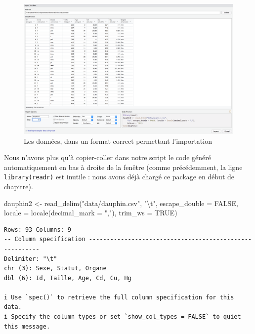 \documentclass[
  letterpaper,
  DIV=11,
  numbers=noendperiod]{scrreprt}
\newenvironment{Shaded}{\begin{snugshade}}{\end{snugshade}}
\newcommand{\AttributeTok}[1]{\textcolor[rgb]{0.40,0.45,0.13}{#1}}
\newcommand{\ConstantTok}[1]{\textcolor[rgb]{0.56,0.35,0.01}{#1}}
\newcommand{\FunctionTok}[1]{\textcolor[rgb]{0.28,0.35,0.67}{#1}}
\newcommand{\NormalTok}[1]{\textcolor[rgb]{0.00,0.23,0.31}{#1}}
\newcommand{\OtherTok}[1]{\textcolor[rgb]{0.00,0.23,0.31}{#1}}
\newcommand{\SpecialCharTok}[1]{\textcolor[rgb]{0.37,0.37,0.37}{#1}}
\newcommand{\StringTok}[1]{\textcolor[rgb]{0.13,0.47,0.30}{#1}}
\begin{document}
\begin{figure}

{\centering \includegraphics[width=1\textwidth,height=\textheight]{./images/importcsv4.png}

}

\caption{Les données, dans un format correct permettant l'importation}

\end{figure}

Nous n'avons plus qu'à copier-coller dans notre script le code généré
automatiquement en bas à droite de la fenêtre (comme précédemment, la
ligne \texttt{library(readr)} est inutile : nous avons déjà chargé ce
package en début de chapitre).

\begin{Shaded}
\begin{Highlighting}[]
\NormalTok{dauphin2 }\OtherTok{\textless{}{-}} \FunctionTok{read\_delim}\NormalTok{(}\StringTok{"data/dauphin.csv"}\NormalTok{, }
    \StringTok{"}\SpecialCharTok{\textbackslash{}t}\StringTok{"}\NormalTok{, }\AttributeTok{escape\_double =} \ConstantTok{FALSE}\NormalTok{, }\AttributeTok{locale =} \FunctionTok{locale}\NormalTok{(}\AttributeTok{decimal\_mark =} \StringTok{","}\NormalTok{), }
    \AttributeTok{trim\_ws =} \ConstantTok{TRUE}\NormalTok{)}
\end{Highlighting}
\end{Shaded}

\begin{verbatim}
Rows: 93 Columns: 9
-- Column specification --------------------------------------------------------
Delimiter: "\t"
chr (3): Sexe, Statut, Organe
dbl (6): Id, Taille, Age, Cd, Cu, Hg

i Use `spec()` to retrieve the full column specification for this data.
i Specify the column types or set `show_col_types = FALSE` to quiet this message.
\end{verbatim}
\end{document}
